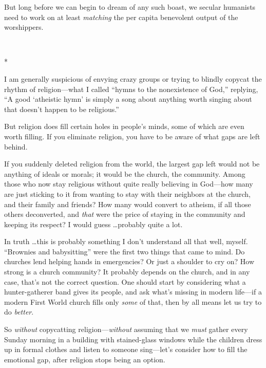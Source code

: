 {
 But long before we can begin to dream of any such boast, we
secular humanists need to work on at least \textit{matching} the per
capita benevolent output of the worshippers.}

{\centering
 \ ~
\par}

{\centering
 *
\par}


{
 I am generally suspicious of envying crazy groups or trying to
blindly copycat the rhythm of religion---what I called
``hymns to the nonexistence of
God,'' replying, ``A good
`atheistic hymn' is simply a song about
anything worth singing about that doesn't happen to be
religious.'' }

{
 But religion does fill certain holes in people's
minds, some of which are even worth filling. If you eliminate religion,
you have to be aware of what gaps are left behind.}

{
 If you suddenly deleted religion from the world, the largest gap
left would not be anything of ideals or morals; it would be the church,
the community. Among those who now stay religious without quite really
believing in God---how many are just sticking to it from wanting to
stay with their neighbors at the church, and their family and friends?
How many would convert to atheism, if all those others deconverted, and
\textit{that} were the price of staying in the community and keeping
its respect? I would guess \ldots probably quite a lot.}

{
 In truth \ldots this is probably something I don't
understand all that well, myself. ``Brownies and
babysitting'' were the first two things that came to
mind. Do churches lend helping hands in emergencies? Or just a shoulder
to cry on? How strong is a church community? It probably depends on the
church, and in any case, that's not the correct
question. One should start by considering what a hunter-gatherer band
gives its people, and ask what's missing in modern
life---if a modern First World church fills only \textit{some} of that,
then by all means let us try to do \textit{better}.}

{
 So \textit{without} copycatting religion---\textit{without}
assuming that we \textit{must} gather every Sunday morning in a
building with stained-glass windows while the children dress up in
formal clothes and listen to someone sing---let's
consider how to fill the emotional gap, after religion stops being an
option.}

